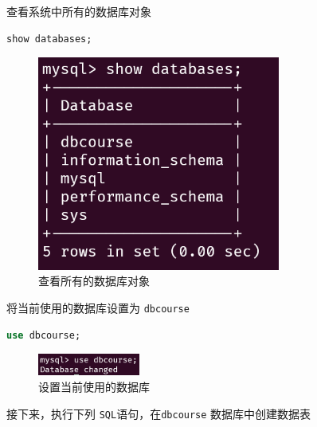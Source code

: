 \documentclass{article}
\begin{document}
查看系统中所有的数据库对象

\begin{lstlisting}[language=sql]
show databases;
\end{lstlisting}

\begin{figure}[H]
  \centering
  \includegraphics[width=8cm]{img/9.png}
  \caption{查看所有的数据库对象}
\end{figure}

将当前使用的数据库设置为 \texttt{dbcourse}

\begin{lstlisting}[language=sql]
use dbcourse;
\end{lstlisting}

\begin{figure}[H]
  \centering
  \includegraphics[width=0.3\textwidth]{img/10.png}
  \caption{设置当前使用的数据库}
\end{figure}

接下来，执行下列 \texttt{SQL}语句，在\texttt{dbcourse} 数据库中创建数据表
\end{document}
